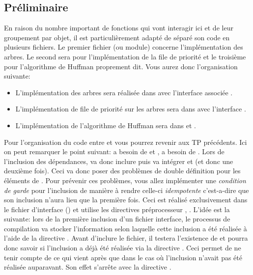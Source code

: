 \documentclass[a4paper, 10pt]{article}
\begin{document}
\subsection{Préliminaire}
En raison du nombre important de fonctions qui vont interagir ici et de leur groupement par objet, il est particulièrement adapté de séparé son code en plusieurs fichiers. Le premier fichier (ou module) concerne l'implémentation des arbres. Le second sera pour l'implémentation de la file de priorité et le troisième pour l'algorithme de Huffman proprement dit.
Vous aurez donc l'organisation suivante:
\begin{itemize}
\item L'implémentation des arbres sera réalisée dans  avec l'interface associée .
\item L'implémentation de file de priorité sur les arbres sera dans  avec l'interface .
\item L'implémentation de l'algorithme de Huffman sera dans  et .
\end{itemize}
Pour l'organisation du code entre  et  vous pourrez revenir aux TP précédents.
\smallbreak
Ici on peut remarquer le point suivant:  a besoin de  et ,  a besoin de . Lors de l'inclusion des dépendances,  va donc inclure  puis  va intégrer  et  (et donc  une deuxième fois). Ceci va donc poser des problèmes de double définition pour les éléments de .
\smallbreak
Pour prévenir ces problèmes, vous allez implémenter une \emph{condition de garde} pour l'inclusion de manière à rendre celle-ci \emph{idempotente} c'est-a-dire que son inclusion n'aura lieu que la première fois.
\smallbreak
Ceci est réalisé exclusivement dans le fichier d'interface () et utilise les directives préprocesseur ,  . L'idée est la suivante: lors de la première inclusion d'un fichier interface, le processus de compilation va stocker l'information selon laquelle cette inclusion a été réalisée à l'aide de la directive . Avant d'inclure le fichier, il testera l'existence de  et pourra donc savoir si l'inclusion a déjà été réalisée via la directive . Ceci permet de ne tenir compte de ce qui vient après que dans le cas où l'inclusion n'avait pas été réalisée auparavant. Son effet s'arrête avec la directive .
\end{document}
